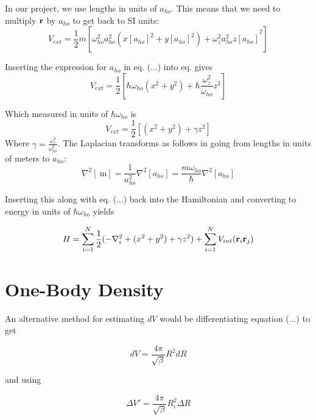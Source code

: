 \documentclass[
    a4paper, aps, twocolumn, floatfix, superscriptaddress,
    nofootinbib]{revtex4-1}
\begin{document}
\begin{appendices}
In our project, we use lengths in units of $a_{ho}$. This means that we need to multiply $\bold{r}$ by $a_{ho}$ to get back to SI units:  
\begin{equation}
    V_{ext} = \frac{1}{2}m\left[ \omega_{ho}^2{a_{ho}^2 (x[a_{ho}]^2+y[a_{ho}]^2) + \omega_z^2 a_{ho}^2z[a_{ho}]}^2 \right]
\end{equation}


Inserting the expression for $a_{ho}$ in eq. (...) into eq. gives 
\begin{equation}
     V_{ext} = \frac{1}{2}[\hbar\omega_{ho} (x^2+y^2) + \hbar \frac{\omega_z^2}{\omega_{ho}} z^2]
\end{equation}

Which measured in units of $\hbar \omega_{ho}$ is 
\begin{equation}
     V_{ext} = \frac{1}{2}[(x^2+y^2) + \gamma z^2]
\end{equation}
Where $\gamma = \frac{\omega_z^2}{\omega_{ho}^2}$. The Laplacian transforms as follows in going from lengths in units of meters to $a_{ho}$: 
\begin{equation}
    \nabla^2[\SI{}{\meter}] = \frac{1}{a_{ho}^2} \nabla^2[a_{ho}] = \frac{m\omega_{ho}}{\hbar}\nabla^2[a_{ho}]
\end{equation}

Inserting this along with eq. (...) back into the Hamiltonian and converting to energy in units of $\hbar \omega_{ho}$ yields 

\begin{equation}
    H = \sum_{i=1}^{N} \frac{1}{2}(-\nabla_i^2 +(x^2+y^2) + \gamma z^2) + \sum_{i=1}^N V_{int}(\bold r_i \bold r_j)
\end{equation}



\section{One-Body Density}

An alternative method for estimating $dV$ would be differentiating equation (...) to get

\begin{equation}
    dV = \frac{4\pi}{\sqrt{\beta}}R^2 dR
\end{equation}

and using

\begin{equation}
    \Delta V' = \frac{4\pi}{\sqrt{\beta}}R_i^2 \Delta R
\end{equation}


\end{appendices}
\end{document}
